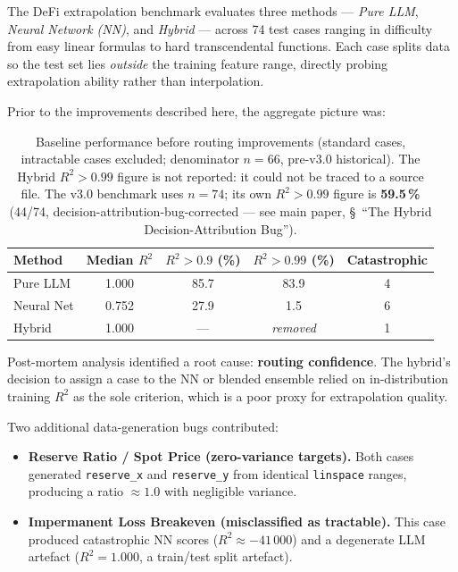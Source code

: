 \documentclass[twoside,11pt]{article}
\begin{document}
The DeFi extrapolation benchmark evaluates three methods --- \emph{Pure LLM},
\emph{Neural Network (NN)}, and \emph{Hybrid} --- across 74 test cases ranging
in difficulty from easy linear formulas to hard transcendental functions.
Each case splits data so the test set lies \emph{outside} the training feature
range, directly probing extrapolation ability rather than interpolation.

Prior to the improvements described here, the aggregate picture was:

\begin{table}[h]
\centering
\caption{Baseline performance before routing improvements (standard cases,
         intractable cases excluded; denominator $n{=}66$, pre-v3.0 historical). The Hybrid
         $R^2>0.99$ figure is not reported: it could not be traced to a source file. The v3.0
         benchmark uses $n=74$; its own $R^2>0.99$ figure is \textbf{59.5\,\%} (44/74,
         decision-attribution-bug-corrected --- see main paper, \S~``The Hybrid
         Decision-Attribution Bug'').}
\label{tab:baseline}
\begin{tabular}{lcccc}
\toprule
Method & Median $R^2$ & $R^2 > 0.9$ (\%) & $R^2 > 0.99$ (\%) & Catastrophic \\
\midrule
Pure LLM    & 1.000 & 85.7 & 83.9 & 4 \\
Neural Net  & 0.752 & 27.9 &  1.5 & 6 \\
Hybrid      & 1.000 & --- & \emph{removed} & 1 \\
\bottomrule
\end{tabular}
\end{table}

Post-mortem analysis identified a root cause: \textbf{routing confidence}. The hybrid's decision
to assign a case to the NN or blended ensemble relied on in-distribution
training $R^2$ as the sole criterion, which is a poor proxy for
extrapolation quality.

Two additional data-generation bugs contributed:

\begin{itemize}[leftmargin=*]
  \item \textbf{Reserve Ratio / Spot Price (zero-variance targets).}
    Both cases generated \texttt{reserve\_x} and \texttt{reserve\_y} from
    identical \texttt{linspace} ranges, producing a ratio $\approx 1.0$ with
    negligible variance.
  \item \textbf{Impermanent Loss Breakeven (misclassified as tractable).}
    This case produced catastrophic NN scores ($R^2 \approx -41\,000$) and a
    degenerate LLM artefact ($R^2 = 1.000$, a train/test split artefact).
\end{itemize}
\end{document}
